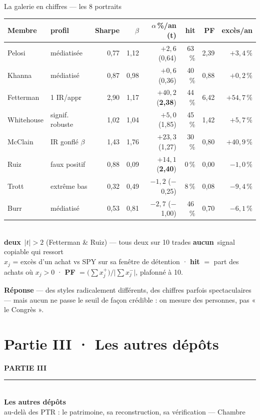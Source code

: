 \documentclass[11pt,aspectratio=169]{beamer}
\newcommand{\repband}[1]{%
  \colorbox{okgreen!12}{\parbox{\dimexpr\textwidth-10pt}{\scriptsize
    \textbf{\textcolor{okgreen}{Réponse}}\; --- #1}}}
\newcommand{\partdivider}[4]{%
  {\setbeamercolor{background canvas}{bg=#1}
  \begin{frame}[plain]
    \centering\vfill
    {\color{white}\Large\textbf{#2}}\\[3.5mm]
    {\color{white!75}\rule{0.40\textwidth}{1pt}}\\[4.5mm]
    {\color{white}\fontsize{32}{36}\selectfont\textbf{#3}}\\[5.5mm]
    {\color{white!88}\large #4}
    \vfill
  \end{frame}}}
\newcommand{\kpi}[3]{{\large\textbf{\textcolor{#1}{#2}}}~{\footnotesize #3}}
\newcommand{\defl}[1]{{\scriptsize\color{black!55}#1}}
\begin{document}
\begin{frame}{La galerie en chiffres — les 8 portraits}
  \centering
  {\footnotesize
  \begin{tabular}{@{}l l r r r r r r@{}}
    \toprule
    Membre & profil & Sharpe & $\beta$ & $\alpha$\,\%/an (t) & hit & PF & excès/an\\\midrule
    Pelosi     & médiatisée       & 0,77 & 1,12 & $+2{,}6$ (0,64)    & 63\,\% & 2,39 & $+3{,}4\,\%$\\
    Khanna     & médiatisé        & 0,87 & 0,98 & $+0{,}6$ (0,36)    & 40\,\% & 0,88 & $+0{,}2\,\%$\\
    Fetterman  & 1\up{er} IR/appr & 2,90 & 1,17 & $+40{,}2$ (\textbf{2,38}) & 44\,\% & 6,42 & $+54{,}7\,\%$\\
    Whitehouse & signif. robuste  & 1,02 & 1,04 & $+5{,}0$ (1,85)    & 45\,\% & 1,42 & $+5{,}7\,\%$\\
    McClain    & IR gonflé $\beta$ & 1,43 & 1,76 & $+23{,}3$ (1,27)  & 30\,\% & 0,80 & $+40{,}9\,\%$\\
    Ruiz       & faux positif     & 0,88 & 0,09 & $+14{,}1$ (\textbf{2,40}) & \phantom{0}0\,\% & 0,00 & $-1{,}0\,\%$\\
    Trott      & extrême bas      & 0,32 & 0,49 & $-1{,}2$ ($-$0,25) & \phantom{0}8\,\% & 0,08 & $-9{,}4\,\%$\\
    Burr       & médiatisé        & 0,53 & 0,81 & $-2{,}7$ ($-$1,00) & 46\,\% & 0,70 & $-6{,}1\,\%$\\
    \bottomrule
  \end{tabular}}\\[2mm]
  \kpi{helec}{deux}{$|t|>2$ (Fetterman \& Ruiz) — tous deux sur 10 trades}\hspace{6mm}%
  \kpi{grisC}{aucun}{signal copiable qui ressort}\\[1.5mm]
  \defl{$x_j$ = excès d'un achat vs SPY sur sa fenêtre de détention · \textbf{hit} $=$ part des achats où $x_j>0$ · \textbf{PF} $=\bigl(\textstyle\sum x_j^{+}\bigr)\big/\bigl|\textstyle\sum x_j^{-}\bigr|$, plafonné à 10.}\\[1mm]
  \repband{des styles radicalement différents, des chiffres parfois spectaculaires — mais aucun ne passe le seuil de façon crédible : on mesure des personnes, pas « le Congrès ».}
\end{frame}

\section{Partie III · Les autres dépôts}
\partdivider{dataC}{PARTIE III}{Les autres dépôts}{au-delà des PTR : le patrimoine, sa reconstruction, sa vérification --- Chambre}
\end{document}
